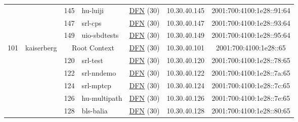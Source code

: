 \begin{small}
\begin{center}
\begin{longtable}{|c|c|c|c|c|c|c|c|}
  &  & \tiny{145} & \multicolumn{1}{|l|}{\tiny{hu-luiji}} & \multicolumn{2}{|c|}{\tiny{\href{https://www.dfn.de}{DFN} (30)}} & \tiny{10.30.40.145} & \tiny{2001:700:4100:1e28::91:64} \\* \cline{3-3}\cline{4-4}\cline{5-5}\cline{6-6}\cline{7-7}\cline{8-8}
  &  & \tiny{147} & \multicolumn{1}{|l|}{\tiny{srl-cps}} & \multicolumn{2}{|c|}{\tiny{\href{https://www.dfn.de}{DFN} (30)}} & \tiny{10.30.40.147} & \tiny{2001:700:4100:1e28::93:64} \\* \cline{3-3}\cline{4-4}\cline{5-5}\cline{6-6}\cline{7-7}\cline{8-8}
  &  & \tiny{149} & \multicolumn{1}{|l|}{\tiny{uio-sbdtests}} & \multicolumn{2}{|c|}{\tiny{\href{https://www.dfn.de}{DFN} (30)}} & \tiny{10.30.40.149} & \tiny{2001:700:4100:1e28::95:64} \\ \hline
 \multirow{16}{*}{\tiny{101}} & \multicolumn{1}{|l|}{\multirow{16}{*}{\tiny{kaiserberg}}} & \multicolumn{2}{|c|}{\tiny{Root Context}} & \multicolumn{2}{|c|}{\tiny{\href{https://www.dfn.de}{DFN} (30)}} & \tiny{10.30.40.101} & \tiny{2001:700:4100:1e28::65} \\* \cline{3-3}\cline{4-4}\cline{5-5}\cline{6-6}\cline{7-7}\cline{8-8}
  &  & \tiny{120} & \multicolumn{1}{|l|}{\tiny{srl-test}} & \multicolumn{2}{|c|}{\tiny{\href{https://www.dfn.de}{DFN} (30)}} & \tiny{10.30.40.120} & \tiny{2001:700:4100:1e28::78:65} \\* \cline{3-3}\cline{4-4}\cline{5-5}\cline{6-6}\cline{7-7}\cline{8-8}
  &  & \tiny{122} & \multicolumn{1}{|l|}{\tiny{srl-nndemo}} & \multicolumn{2}{|c|}{\tiny{\href{https://www.dfn.de}{DFN} (30)}} & \tiny{10.30.40.122} & \tiny{2001:700:4100:1e28::7a:65} \\* \cline{3-3}\cline{4-4}\cline{5-5}\cline{6-6}\cline{7-7}\cline{8-8}
  &  & \tiny{124} & \multicolumn{1}{|l|}{\tiny{srl-mptcp}} & \multicolumn{2}{|c|}{\tiny{\href{https://www.dfn.de}{DFN} (30)}} & \tiny{10.30.40.124} & \tiny{2001:700:4100:1e28::7c:65} \\* \cline{3-3}\cline{4-4}\cline{5-5}\cline{6-6}\cline{7-7}\cline{8-8}
  &  & \tiny{126} & \multicolumn{1}{|l|}{\tiny{hu-multipath}} & \multicolumn{2}{|c|}{\tiny{\href{https://www.dfn.de}{DFN} (30)}} & \tiny{10.30.40.126} & \tiny{2001:700:4100:1e28::7e:65} \\* \cline{3-3}\cline{4-4}\cline{5-5}\cline{6-6}\cline{7-7}\cline{8-8}
  &  & \tiny{128} & \multicolumn{1}{|l|}{\tiny{bls-balia}} & \multicolumn{2}{|c|}{\tiny{\href{https://www.dfn.de}{DFN} (30)}} & \tiny{10.30.40.128} & \tiny{2001:700:4100:1e28::80:65} \\* \cline{3-3}\cline{4-4}\cline{5-5}\cline{6-6}\cline{7-7}\cline{8-8}

\end{longtable}
\end{center}
\end{small}

